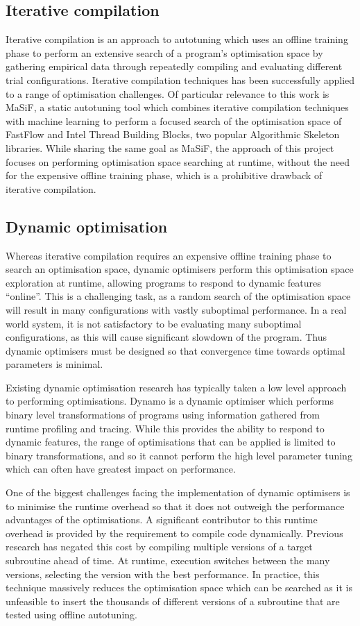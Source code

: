 \subsection{Iterative compilation}
Iterative compilation is an approach to autotuning which uses an
offline training phase to perform an extensive search of a program's
optimisation space by gathering empirical data through repeatedly
compiling and evaluating different trial configurations. Iterative
compilation techniques has been successfully applied to a range of
optimisation challenges. Of particular relevance to this work is
MaSiF, a static autotuning tool which combines iterative compilation
techniques with machine learning to perform a focused search of the
optimisation space of FastFlow and Intel Thread Building Blocks, two
popular Algorithmic Skeleton libraries. While sharing the same goal as
MaSiF, the approach of this project focuses on performing optimisation
space searching at runtime, without the need for the expensive offline
training phase, which is a prohibitive drawback of iterative
compilation.

\subsection{Dynamic optimisation}
Whereas iterative compilation requires an expensive offline training
phase to search an optimisation space, dynamic optimisers perform this
optimisation space exploration at runtime, allowing programs to
respond to dynamic features ``online''. This is a challenging task, as
a random search of the optimisation space will result in many
configurations with vastly suboptimal performance. In a real world
system, it is not satisfactory to be evaluating many suboptimal
configurations, as this will cause significant slowdown of the
program. Thus dynamic optimisers must be designed so that convergence
time towards optimal parameters is minimal.

Existing dynamic optimisation research has typically taken a low level
approach to performing optimisations. Dynamo is a dynamic optimiser
which performs binary level transformations of programs using
information gathered from runtime profiling and tracing. While this
provides the ability to respond to dynamic features, the range of
optimisations that can be applied is limited to binary
transformations, and so it cannot perform the high level parameter
tuning which can often have greatest impact on performance.

One of the biggest challenges facing the implementation of dynamic
optimisers is to minimise the runtime overhead so that it does not
outweigh the performance advantages of the optimisations. A
significant contributor to this runtime overhead is provided by the
requirement to compile code dynamically. Previous research has negated
this cost by compiling multiple versions of a target subroutine ahead
of time. At runtime, execution switches between the many versions,
selecting the version with the best performance. In practice, this
technique massively reduces the optimisation space which can be
searched as it is unfeasible to insert the thousands of different
versions of a subroutine that are tested using offline autotuning.

